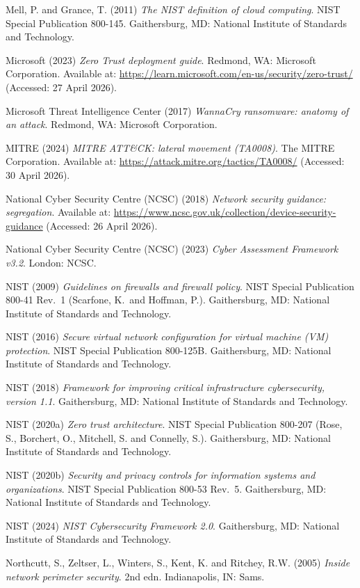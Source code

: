 Mell, P. and Grance, T. (2011) \textit{The NIST definition of cloud computing}. NIST Special Publication 800-145. Gaithersburg, MD: National Institute of Standards and Technology.

Microsoft (2023) \textit{Zero Trust deployment guide}. Redmond, WA: Microsoft Corporation. Available at: \url{https://learn.microsoft.com/en-us/security/zero-trust/} (Accessed: 27 April 2026).

Microsoft Threat Intelligence Center (2017) \textit{WannaCry ransomware: anatomy of an attack}. Redmond, WA: Microsoft Corporation.

MITRE (2024) \textit{MITRE ATT\&CK: lateral movement (TA0008)}. The MITRE Corporation. Available at: \url{https://attack.mitre.org/tactics/TA0008/} (Accessed: 30 April 2026).

National Cyber Security Centre (NCSC) (2018) \textit{Network security guidance: segregation}. Available at: \url{https://www.ncsc.gov.uk/collection/device-security-guidance} (Accessed: 26 April 2026).

National Cyber Security Centre (NCSC) (2023) \textit{Cyber Assessment Framework v3.2}. London: NCSC.

NIST (2009) \textit{Guidelines on firewalls and firewall policy}. NIST Special Publication 800-41 Rev.~1 (Scarfone, K.\ and Hoffman, P.). Gaithersburg, MD: National Institute of Standards and Technology.

NIST (2016) \textit{Secure virtual network configuration for virtual machine (VM) protection}. NIST Special Publication 800-125B. Gaithersburg, MD: National Institute of Standards and Technology.

NIST (2018) \textit{Framework for improving critical infrastructure cybersecurity, version 1.1}. Gaithersburg, MD: National Institute of Standards and Technology.

NIST (2020a) \textit{Zero trust architecture}. NIST Special Publication 800-207 (Rose, S., Borchert, O., Mitchell, S. and Connelly, S.). Gaithersburg, MD: National Institute of Standards and Technology.

NIST (2020b) \textit{Security and privacy controls for information systems and organizations}. NIST Special Publication 800-53 Rev.~5. Gaithersburg, MD: National Institute of Standards and Technology.

NIST (2024) \textit{NIST Cybersecurity Framework 2.0}. Gaithersburg, MD: National Institute of Standards and Technology.

Northcutt, S., Zeltser, L., Winters, S., Kent, K. and Ritchey, R.W. (2005) \textit{Inside network perimeter security}. 2nd edn. Indianapolis, IN: Sams.

